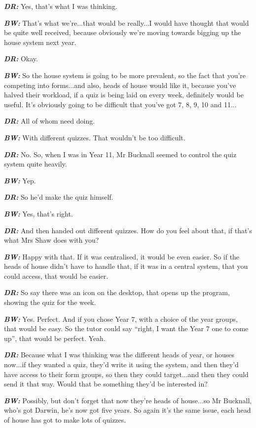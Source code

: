 \textit{\textbf{DR:}} Yes, that's what I was thinking.

\textit{\textbf{BW:}} That's what we're...that would be really...I would have thought that would be quite well received, because obviously we're moving towards bigging up the house system next year. 

\textit{\textbf{DR:}} Okay.

\textit{\textbf{BW:}} So the house system is going to be more prevalent, so the fact that you're competing into forms...and also, heads of house would like it, because you've halved their workload, if a quiz is being laid on every week, definitely would be useful. It's obviously going to be difficult that you've got 7, 8, 9, 10 and 11...

\textit{\textbf{DR:}} All of whom need doing.

\textit{\textbf{BW:}} With different quizzes. That wouldn't be too difficult.

\textit{\textbf{DR:}} No. So, when I was in Year 11, Mr Bucknall seemed to control the quiz system quite heavily.

\textit{\textbf{BW:}} Yep.

\textit{\textbf{DR:}} So he'd make the quiz himself.

\textit{\textbf{BW:}} Yes, that's right.

\textit{\textbf{DR:}} And then handed out different quizzes. How do you feel about that, if that's what Mrs Shaw does with you?

\textit{\textbf{BW:}} Happy with that. If it was centralised, it would be even easier. So if the heads of house didn't have to handle that, if it was in a central system, that you could access, that would be easier.

\textit{\textbf{DR:}} So say there was an icon on the desktop, that opens up the program, showing the quiz for the week. 

\textit{\textbf{BW:}} Yes. Perfect. And if you chose Year 7, with a choice of the year groups, that would be easy. So the tutor could say ``right, I want the Year 7 one to come up'', that would be perfect. Yeah.

\textit{\textbf{DR:}} Because what I was thinking was the different heads of year, or houses now...if they wanted a quiz, they'd write it using the system, and then they'd have access to their form groups, so then they could target...and then they could send it that way. Would that be something they'd be interested in?

\textit{\textbf{BW:}} Possibly, but don't forget that now they're heads of house...so Mr Bucknall, who's got Darwin, he's now got five years. So again it's the same issue, each head of house has got to make lots of quizzes. 

